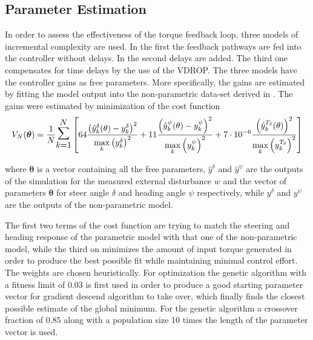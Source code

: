 \subsection{Parameter Estimation }

In order to assess the effectiveness of the torque feedback loop, three models of incremental complexity are used. In the first the feedback pathways are fed into the controller without delays. In the second delays are added. The third one compensates for time delays by the use of the VDROP. The three models have the  controller gains as free parameters. More specifically, the gains are estimated by fitting the model output into the non-parametric data-set derived in \cite{dialynaseffect}.  The gains were estimated by minimization of the cost function 
\begin{equation}
    V_{N}(\boldsymbol{\theta})=\frac{1}{N} \mathlarger{\mathlarger{\mathlarger{\sum}}}_{k=1}^{N}\left[64\frac{\left(\hat{y}^{\delta}_k(\mathbf{\theta})-y^\delta_k\right)^{2}}{\underset{k}{\max} \left(y^\delta_k\right)^2}+11\frac{\left(\hat{y}^{\psi}_k(\mathbf{\theta})-y^\psi_k\right)^{2}}{\underset{k}{\max} \left(y^\psi_k\right)^2}+7\cdot10^{-6}\frac{\left(\hat{y}^{T_\delta}_k(\mathbf{\theta})\right)^2}{\underset{k}{\max} \left(y^{T_\delta}_k\right)^2}\right]
    \label{eq:cost}
    \end{equation}

where \ensuremath{\boldsymbol{\theta}} is a vector containing all the free parameters, \ensuremath{\hat{y}^{\delta}} and \ensuremath{\hat{y}^{\psi}} are the outputs of the simulation for the measured external disturbance \ensuremath{w} and the vector of parameters  \ensuremath{\boldsymbol{\theta}} for steer angle \ensuremath{\delta} and heading angle \ensuremath{\psi}  respectively, while \ensuremath{y^\delta} and \ensuremath{y^\psi} are the outputs of the non-parametric model.

The first two terms  of the cost function are trying to match the steering and heading  response of the parametric model with that one of the non-parametric model, while the third on minimizes the amount of input torque generated in order to produce the best possible fit while maintaining minimal control effort. The weights are chosen heuristically. For optimization the genetic algorithm with a fitness limit of 0.03 is first  used in order to produce a good starting parameter vector for gradient descend algorithm to take over, which finally finds the closest possible estimate of the global minimum. For the genetic algorithm a crossover fraction of 0.85  along with a population size 10 times the length of the parameter vector is used.


